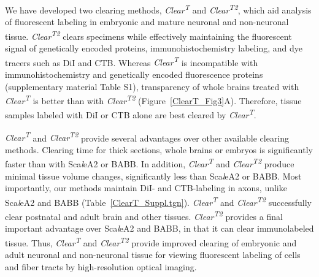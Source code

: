 We have developed two clearing methods, \emph{Clear\textsuperscript{T}} and \emph{Clear\textsuperscript{T2}}, which aid analysis of fluorescent labeling in embryonic and mature neuronal and non-neuronal tissue.
\emph{Clear\textsuperscript{T2}} clears specimens while effectively maintaining the fluorescent signal of genetically encoded proteins, immunohistochemistry labeling, and dye tracers such as DiI and CTB.
Whereas \emph{Clear\textsuperscript{T}} is incompatible with immunohistochemistry and genetically encoded fluorescence proteins (supplementary material Table S1), transparency of whole brains treated with \emph{Clear\textsuperscript{T}} is better than with \emph{Clear\textsuperscript{T2}} (Figure~\ref{ClearT_Fig3}A).
Therefore, tissue samples labeled with DiI or CTB alone are best cleared by \emph{Clear\textsuperscript{T}}.

\emph{Clear\textsuperscript{T}} and \emph{Clear\textsuperscript{T2}} provide several advantages over other available clearing methods.
Clearing time for thick sections, whole brains or embryos is significantly faster than with Sca\emph{l}eA2 or BABB.
In addition, \emph{Clear\textsuperscript{T}} and \emph{Clear\textsuperscript{T2}} produce minimal tissue volume changes, significantly less than Sca\emph{l}eA2 or BABB.
Most importantly, our methods maintain DiI- and CTB-labeling in axons, unlike Sca\emph{l}eA2 and BABB (Table~\ref{ClearT_Suppl.tgn}).
\emph{Clear\textsuperscript{T}} and \emph{Clear\textsuperscript{T2}} successfully clear postnatal and adult brain and other tissues.
\emph{Clear\textsuperscript{T2}} provides a final important advantage over Sca\emph{l}eA2 and BABB, in that it can clear immunolabeled tissue.
Thus, \emph{Clear\textsuperscript{T}} and \emph{Clear\textsuperscript{T2}} provide improved clearing of embryonic and adult neuronal and non-neuronal tissue for viewing fluorescent labeling of cells and fiber tracts by high-resolution optical imaging.

